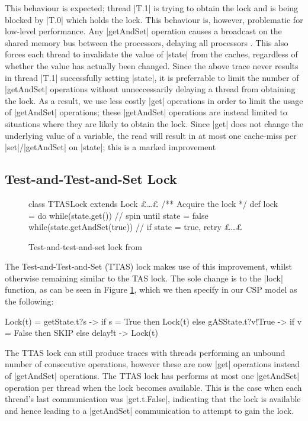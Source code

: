 This behaviour is expected; thread |T.1| is trying to obtain the lock and is being blocked by |T.0| which holds the lock. This behaviour is, however, problematic for low-level performance. Any |getAndSet| operation causes a broadcast on the shared memory bus between the processors, delaying all processors . This also forces each thread to invalidate the value of |state| from the caches, regardless of whether the value has actually been changed. Since the above trace never results in thread |T.1| successfully setting |state|, it is preferrable to limit the number of |getAndSet| operations without unneccessarily delaying a thread from obtaining the lock. As a result, we use less costly |get| operations in order to limit the usage of |getAndSet| operations; these |getAndSet| operations are instead limited to situations where they are likely to obtain the lock. Since |get| does not change the underlying value of a variable, the read will result in at most one cache-miss per |set|/|getAndSet| on |state|; this is a marked improvement 


\subsection{Test-and-Test-and-Set Lock}

\begin{figure}
  \begin{scala}
    class TTASLock extends Lock{ 
      £\dots£
      /** Acquire the lock */
      def lock = 
        do{
          while(state.get()){ } // spin until state = false
        } while(state.getAndSet(true)) // if state = true, retry
      £\dots£
    }
  \end{scala}
  \caption{Test-and-test-and-set lock from \cite{CADS}  \label{scala:TTAS}}
\end{figure}

The Test-and-Test-and-Set (TTAS) lock makes use of this improvement, whilst otherwise remaining similar to the TAS lock. The sole change is to the |lock| function, as can be seen in Figure \ref{scala:TTAS}, which we then specify in our CSP model as the following: 
\begin{cspm}
  Lock(t) =  getState.t?s -> if s = True then Lock(t)
                             else gASState.t?v!True -> if v = False then SKIP
                             else delay!t -> Lock(t)
\end{cspm}
The TTAS lock can still produce traces with threads performing an unbound number of consecutive operations, however these are now |get| operations instead of |getAndSet| operations. %
The TTAS lock has performs at most one |getAndSet| operation per thread when the lock becomes available. This is the case when each thread's last communication was |get.t.False|, indicating that the lock is available and hence leading to a |getAndSet| communication to attempt to gain the lock.

